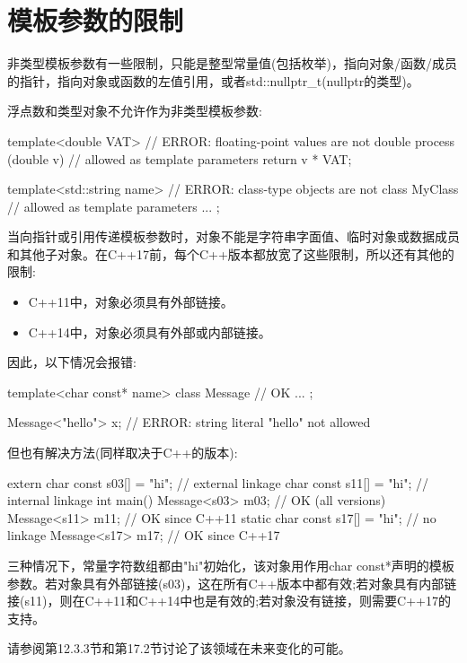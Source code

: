 \section{模板参数的限制}
非类型模板参数有一些限制，只能是整型常量值(包括枚举)，指向对象/函数/成员的指针，指向对象或函数的左值引用，或者std::nullptr\_t(nullptr的类型)。

浮点数和类型对象不允许作为非类型模板参数:

\begin{cpp}
template<double VAT> // ERROR: floating-point values are not
double process (double v) // allowed as template parameters
{
	return v * VAT;
}

template<std::string name> // ERROR: class-type objects are not
class MyClass { // allowed as template parameters
	...
};
\end{cpp}

当向指针或引用传递模板参数时，对象不能是字符串字面值、临时对象或数据成员和其他子对象。在C++17前，每个C++版本都放宽了这些限制，所以还有其他的限制:

\begin{itemize}
\item 
C++11中，对象必须具有外部链接。

\item 
C++14中，对象必须具有外部或内部链接。
\end{itemize}

因此，以下情况会报错:

\begin{cpp}
template<char const* name>
class Message { // OK
	...
};

Message<"hello"> x; // ERROR: string literal "hello" not allowed
\end{cpp}

但也有解决方法(同样取决于C++的版本):

\begin{cpp}
extern char const s03[] = "hi"; // external linkage
char const s11[] = "hi"; // internal linkage
int main()
{
	Message<s03> m03; // OK (all versions)
	Message<s11> m11; // OK since C++11
	static char const s17[] = "hi"; // no linkage
	Message<s17> m17; // OK since C++17
}
\end{cpp}

三种情况下，常量字符数组都由"hi"初始化，该对象用作用char const*声明的模板参数。若对象具有外部链接(s03)，这在所有C++版本中都有效;若对象具有内部链接(s11)，则在C++11和C++14中也是有效的;若对象没有链接，则需要C++17的支持。

请参阅第12.3.3节和第17.2节讨论了该领域在未来变化的可能。

